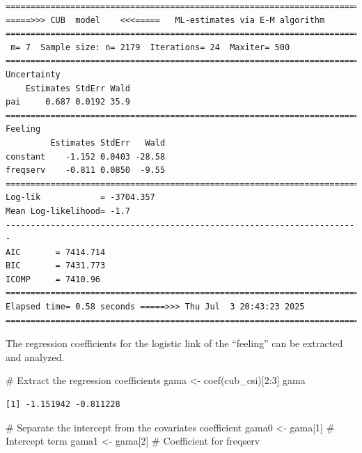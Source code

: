 \documentclass[
  letterpaper,
  DIV=11,
  numbers=noendperiod]{scrartcl}
\newenvironment{Shaded}{\begin{snugshade}}{\end{snugshade}}
\newcommand{\CommentTok}[1]{\textcolor[rgb]{0.37,0.37,0.37}{#1}}
\newcommand{\DecValTok}[1]{\textcolor[rgb]{0.68,0.00,0.00}{#1}}
\newcommand{\FunctionTok}[1]{\textcolor[rgb]{0.28,0.35,0.67}{#1}}
\newcommand{\NormalTok}[1]{\textcolor[rgb]{0.00,0.23,0.31}{#1}}
\newcommand{\OtherTok}[1]{\textcolor[rgb]{0.00,0.23,0.31}{#1}}
\newcommand{\SpecialCharTok}[1]{\textcolor[rgb]{0.37,0.37,0.37}{#1}}
\begin{document}
\begin{verbatim}
======================================================================= 
=====>>> CUB  model    <<<=====   ML-estimates via E-M algorithm   
======================================================================= 
 m= 7  Sample size: n= 2179  Iterations= 24  Maxiter= 500 
======================================================================= 
Uncertainty                                            
    Estimates StdErr Wald
pai     0.687 0.0192 35.9
======================================================================= 
Feeling                                            
         Estimates StdErr   Wald
constant    -1.152 0.0403 -28.58
freqserv    -0.811 0.0850  -9.55
======================================================================= 
Log-lik            = -3704.357 
Mean Log-likelihood= -1.7 
----------------------------------------------------------------------- 
AIC       = 7414.714 
BIC       = 7431.773 
ICOMP     = 7410.96 
======================================================================= 
Elapsed time= 0.58 seconds =====>>> Thu Jul  3 20:43:23 2025 
======================================================================= 
\end{verbatim}

The regression coefficients for the logistic link of the ``feeling'' can
be extracted and analyzed.

\begin{Shaded}
\begin{Highlighting}[]
\CommentTok{\# Extract the regression coefficients}
\NormalTok{gama }\OtherTok{\textless{}{-}} \FunctionTok{coef}\NormalTok{(cub\_csi)[}\DecValTok{2}\SpecialCharTok{:}\DecValTok{3}\NormalTok{]}
\NormalTok{gama}
\end{Highlighting}
\end{Shaded}

\begin{verbatim}
[1] -1.151942 -0.811228
\end{verbatim}

\begin{Shaded}
\begin{Highlighting}[]
\CommentTok{\# Separate the intercept from the covariate\textquotesingle{}s coefficient}
\NormalTok{gama0 }\OtherTok{\textless{}{-}}\NormalTok{ gama[}\DecValTok{1}\NormalTok{] }\CommentTok{\# Intercept term}
\NormalTok{gama1 }\OtherTok{\textless{}{-}}\NormalTok{ gama[}\DecValTok{2}\NormalTok{] }\CommentTok{\# Coefficient for freqserv}
\end{Highlighting}
\end{Shaded}
\end{document}
